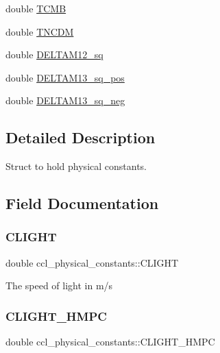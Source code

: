 \begin{DoxyCompactItemize}
double \mbox{\hyperlink{structccl__physical__constants_a38b82fe0fec0eee15d3bb4701617d556}{T\+C\+MB}}
\item 
double \mbox{\hyperlink{structccl__physical__constants_af7fd71a73cc9bbbb18f9419a6c1ededd}{T\+N\+C\+DM}}
\item 
double \mbox{\hyperlink{structccl__physical__constants_a6a31be08c7a55dcc677fa56c4b05cf8b}{D\+E\+L\+T\+A\+M12\+\_\+sq}}
\item 
double \mbox{\hyperlink{structccl__physical__constants_a58b1796c3b7950f0db097bcf4a91d26e}{D\+E\+L\+T\+A\+M13\+\_\+sq\+\_\+pos}}
\item 
double \mbox{\hyperlink{structccl__physical__constants_afc0be44be16b5f3a9589f2d0f713e8d3}{D\+E\+L\+T\+A\+M13\+\_\+sq\+\_\+neg}}
\end{DoxyCompactItemize}


\subsection{Detailed Description}
Struct to hold physical constants. 

\subsection{Field Documentation}
\mbox{\label{structccl__physical__constants_a06e87731251b94440d38270a513ebac9}} 
\subsubsection{\texorpdfstring{C\+L\+I\+G\+HT}{CLIGHT}}
{\footnotesize\ttfamily double ccl\+\_\+physical\+\_\+constants\+::\+C\+L\+I\+G\+HT}

The speed of light in m/s \mbox{\label{structccl__physical__constants_ad3720957ff4700dc076030aafb2c6f22}} 
\subsubsection{\texorpdfstring{C\+L\+I\+G\+H\+T\+\_\+\+H\+M\+PC}{CLIGHT\_HMPC}}
{\footnotesize\ttfamily double ccl\+\_\+physical\+\_\+constants\+::\+C\+L\+I\+G\+H\+T\+\_\+\+H\+M\+PC}

